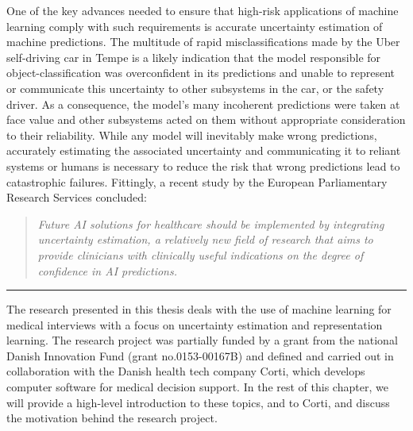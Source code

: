 One of the key advances needed to ensure that high-risk applications of machine learning comply with such requirements is accurate uncertainty estimation of machine predictions. 
The multitude of rapid misclassifications made by the Uber self-driving car in Tempe is a likely indication that the model responsible for object-classification was overconfident in its predictions and unable to represent or communicate this uncertainty to other subsystems in the car, or the safety driver. 
As a consequence, the model's many incoherent predictions were taken at face value and other subsystems acted on them without appropriate consideration to their reliability.
While any model will inevitably make wrong predictions, accurately estimating the associated uncertainty and communicating it to reliant systems or humans is necessary to reduce the risk that wrong predictions lead to catastrophic failures. 
Fittingly, a recent study by the European Parliamentary Research Services \parencite{europeanparliament_artificial_2022} concluded: 
%
\begin{quote}
    \centering\itshape
    Future AI solutions for healthcare should be implemented by integrating uncertainty estimation, a relatively new field of research that aims to provide clinicians with clinically useful indications on the degree of confidence in AI predictions.
\end{quote}
\begin{center}
\noindent\rule{0.2\textwidth}{0.5pt}
\end{center}
\vspace{1em}
%
%
\noindent The research presented in this thesis deals with the use of machine learning for medical interviews with a focus on uncertainty estimation and representation learning. 
The research project was partially funded by a grant from the national Danish Innovation Fund (grant no.\@ 0153-00167B) and defined and carried out in collaboration with the Danish health tech company Corti, which develops computer software for medical decision support. 
In the rest of this chapter, we will provide a high-level introduction to these topics, and to Corti, and discuss the motivation behind the research project.



